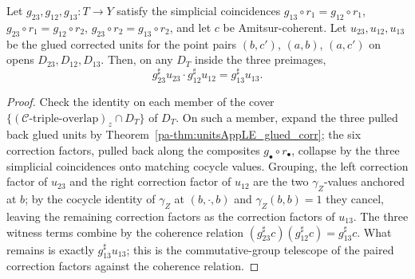\begin{theorem}
  \label{pa-thm:glued_corr_amitsur}
  \leanok

  Let \(g_{23}, g_{12}, g_{13} \colon T \to Y\) satisfy the simplicial coincidences
  \(g_{13} \circ r_1 = g_{12} \circ r_1\), \(g_{23} \circ r_1 = g_{12} \circ r_2\),
  \(g_{23} \circ r_2 = g_{13} \circ r_2\), and let \(c\) be Amitsur-coherent. Let \(u_{23},
  u_{12}, u_{13}\) be the glued corrected units for the point pairs \((b, c')\), \((a, b)\),
  \((a, c')\) on opens \(D_{23}, D_{12}, D_{13}\). Then, on any \(D_T\) inside the three
  preimages,
  \[
    g_{23}^{\sharp} u_{23} \cdot g_{12}^{\sharp} u_{12} = g_{13}^{\sharp} u_{13} .
  \]
\end{theorem}
\begin{proof}
  \leanok
  Check the identity on each member of the cover \(\{(\mathcal C\text{-triple-overlap})_z \cap
  D_T\}\) of \(D_T\). On such a member, expand the three pulled back glued units by
  Theorem~\ref{pa-thm:unitsAppLE_glued_corr}; the six correction factors, pulled back along the
  composites \(g_{\bullet} \circ r_{\bullet}\), collapse by the three simplicial coincidences
  onto matching cocycle values. Grouping, the left correction factor of \(u_{23}\) and the
  right correction factor of \(u_{12}\) are the two \(\gamma_Z\)-values anchored at \(b\); by
  the cocycle identity of \(\gamma_Z\) at \((b, \cdot, b)\) and \(\gamma_Z(b,b) = 1\) they
  cancel, leaving the remaining correction factors as the correction factors of \(u_{13}\). The
  three witness terms combine by the coherence relation
  \((g_{23}^{\sharp} c)(g_{12}^{\sharp} c) = g_{13}^{\sharp} c\). What remains is exactly
  \(g_{13}^{\sharp} u_{13}\); this is the commutative-group telescope of the paired correction
  factors against the coherence relation.
\end{proof}

